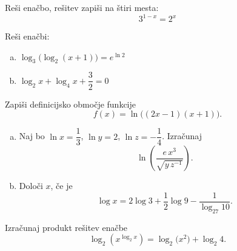 \documentclass[a4paper,12pt]{letter}
\newcounter{tocke}
\begin{document}
\vspace{0.3cm}
\begin{center}
\newpage

\begin{naloga}[\hfill $\tockeB$] \addtocounter{tocke}{\numexpr\tockeB\relax}
Re\v{s}i ena\v{c}bo, rešitev zapiši na štiri mesta:
\[
3^{1-x}=2^{x}
\]
\end{naloga}

\vspace{8cm}

\begin{naloga}[\hfill $\tockeC$] \addtocounter{tocke}{\numexpr\tockeC\relax}
Re\v{s}i ena\v{c}bi:
\begin{enumerate}[a)]
\item $\log_3\big(\log_2(x+1)\big)=e^{\ln 2}$
\item $\log_2 x+\log_4 x+\dfrac32=0$
\end{enumerate}
\end{naloga}\newpage

\begin{naloga}[\hfill $\tockeD$] \addtocounter{tocke}{\numexpr\tockeD\relax}
Zapi\v{s}i definicijsko obmo\v{c}je funkcije
\[
f(x)=\ln\big((2x-1)(x+1)\big).
\]
\end{naloga}\vspace{8 cm}

\begin{naloga}[\hfill $\tockeE$] \addtocounter{tocke}{\numexpr\tockeE\relax}
\begin{enumerate}[a)]
\item Naj bo $\ln x=\dfrac13$, $\ln y=2$, $\ln z=-\dfrac14$. Izra\v{c}unaj
\[
\ln\left(\dfrac{e\,x^3}{\sqrt{y\,z^{-1}}}\right).
\]
\item Dolo\v{c}i $x$, \v{c}e je
\[
\log x=2\log 3+\dfrac12\log 9-\dfrac{1}{\log_{27}10}.
\]
\end{enumerate}
\end{naloga}\newpage

\begin{naloga}[\hfill $\tockeF$] \addtocounter{tocke}{\numexpr\tockeF\relax}
Izra\v{c}unaj produkt re\v{s}itev ena\v{c}be
\[
\log_2\!\left(x^{\log_2 x}\right)=\log_2\big(x^2\big)+\log_2 4.
\]
\end{naloga}


\end{center}
\end{document}

